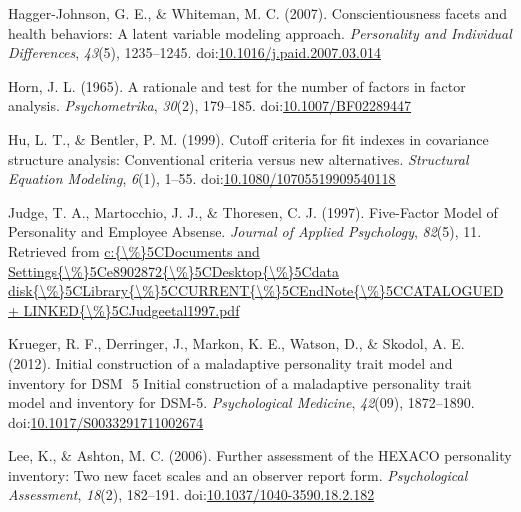 \documentclass[,man,floatsintext]{apa6}
\begin{document}
\hypertarget{ref-Hagger-Johnson2007}{}
Hagger-Johnson, G. E., \& Whiteman, M. C. (2007). Conscientiousness
facets and health behaviors: A latent variable modeling approach.
\emph{Personality and Individual Differences}, \emph{43}(5), 1235--1245.
doi:\href{https://doi.org/10.1016/j.paid.2007.03.014}{10.1016/j.paid.2007.03.014}

\hypertarget{ref-Horn1965}{}
Horn, J. L. (1965). A rationale and test for the number of factors in
factor analysis. \emph{Psychometrika}, \emph{30}(2), 179--185.
doi:\href{https://doi.org/10.1007/BF02289447}{10.1007/BF02289447}

\hypertarget{ref-Hu1999}{}
Hu, L. T., \& Bentler, P. M. (1999). Cutoff criteria for fit indexes in
covariance structure analysis: Conventional criteria versus new
alternatives. \emph{Structural Equation Modeling}, \emph{6}(1), 1--55.
doi:\href{https://doi.org/10.1080/10705519909540118}{10.1080/10705519909540118}

\hypertarget{ref-Judge1997}{}
Judge, T. A., Martocchio, J. J., \& Thoresen, C. J. (1997). Five-Factor
Model of Personality and Employee Absense. \emph{Journal of Applied
Psychology}, \emph{82}(5), 11. Retrieved from
\href{c:\%7B/\%\%7D5CDocuments\%20and\%20Settings\%7B/\%\%7D5Ce8902872\%7B/\%\%7D5CDesktop\%7B/\%\%7D5Cdata\%20disk\%7B/\%\%7D5CLibrary\%7B/\%\%7D5CCURRENT\%7B/\%\%7D5CEndNote\%7B/\%\%7D5CCATALOGUED\%20+\%20LINKED\%7B/\%\%7D5CJudgeetal1997.pdf}{c:\{\textbackslash{}\%\}5CDocuments and Settings\{\textbackslash{}\%\}5Ce8902872\{\textbackslash{}\%\}5CDesktop\{\textbackslash{}\%\}5Cdata disk\{\textbackslash{}\%\}5CLibrary\{\textbackslash{}\%\}5CCURRENT\{\textbackslash{}\%\}5CEndNote\{\textbackslash{}\%\}5CCATALOGUED + LINKED\{\textbackslash{}\%\}5CJudgeetal1997.pdf}

\hypertarget{ref-Krueger2012a}{}
Krueger, R. F., Derringer, J., Markon, K. E., Watson, D., \& Skodol, A.
E. (2012). Initial construction of a maladaptive personality trait model
and inventory for DSM ­ 5 Initial construction of a maladaptive
personality trait model and inventory for DSM-5. \emph{Psychological
Medicine}, \emph{42}(09), 1872--1890.
doi:\href{https://doi.org/10.1017/S0033291711002674}{10.1017/S0033291711002674}

\hypertarget{ref-Lee2006}{}
Lee, K., \& Ashton, M. C. (2006). Further assessment of the HEXACO
personality inventory: Two new facet scales and an observer report form.
\emph{Psychological Assessment}, \emph{18}(2), 182--191.
doi:\href{https://doi.org/10.1037/1040-3590.18.2.182}{10.1037/1040-3590.18.2.182}
\end{document}

